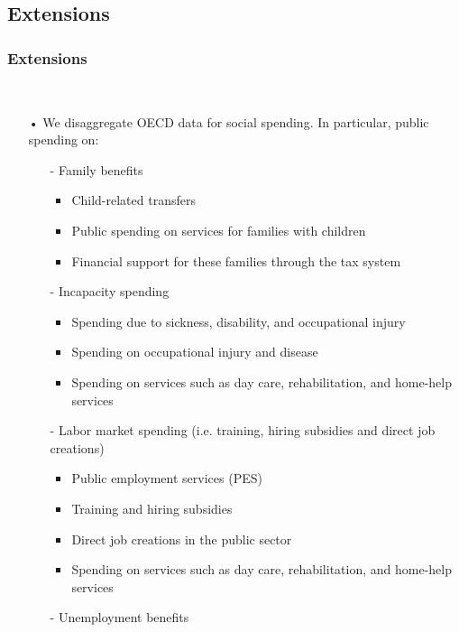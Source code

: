 \documentclass{beamer}
\begin{document}
\begin{frame}
\begin{itemize}
\begin{frame}
\subsection{Extensions} 
\frametitle{Extensions}\
\begin{itemize}
\item[•] We disaggregate OECD data for social spending. In particular, public spending on:
\medskip
\begin{itemize}
\item[-] Family benefits
	\begin{itemize}
	\item Child-related transfers
	\item Public spending on services for families with children
	\item Financial support for these families through the tax system
	\end{itemize}
\item[-] Incapacity spending
\begin{itemize}
	\item Spending due to sickness, disability, and occupational injury
	\item Spending on occupational injury and disease
	\item Spending on services such as day care, rehabilitation, and home-help services
	\end{itemize}
\item[-] Labor market  spending (i.e. training, hiring subsidies and direct job creations)
\begin{itemize}
	\item Public employment services (PES)
	\item Training and hiring subsidies
	\item Direct job creations in the public sector
	\item Spending on services such as day care, rehabilitation, and home-help services
	\end{itemize}
\item[-] Unemployment benefits
\end{itemize} 
\end{itemize}
\end{frame}



\end{itemize}
\end{frame}
\end{document}
